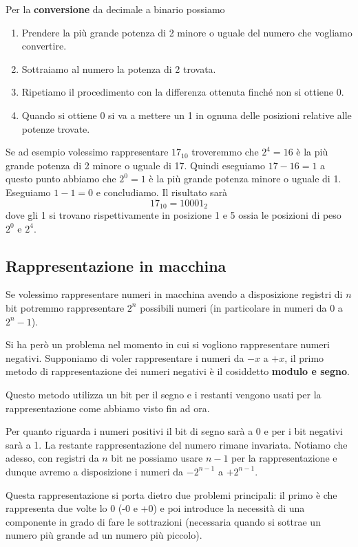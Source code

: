 Per la \textbf{conversione} da decimale a binario possiamo
\begin{enumerate}
	\item Prendere la più grande potenza di 2 minore o uguale del numero che vogliamo convertire.
	\item Sottraiamo al numero la potenza di 2 trovata.
	\item Ripetiamo il procedimento con la differenza ottenuta finché non si ottiene 0.
	\item Quando si ottiene 0 si va a mettere un 1 in ognuna delle posizioni relative alle potenze
	      trovate.
\end{enumerate}
Se ad esempio volessimo rappresentare $17_{10}$ troveremmo che $2^4 = 16$ è la più grande potenza
di 2 minore o uguale di 17. Quindi eseguiamo $17 - 16 = 1$ a questo punto abbiamo che $2^0 = 1$ è
la più grande potenza minore o uguale di 1. Eseguiamo $1-1 = 0$ e concludiamo. Il risultato sarà
\[ 17_{10} = 10001_2 \]
dove gli 1 si trovano rispettivamente in posizione 1 e 5 ossia le posizioni di peso $2^0$ e $2^4$.

\subsection{Rappresentazione in macchina}
Se volessimo rappresentare numeri in macchina avendo a disposizione registri di $n$ bit potremmo
rappresentare $2^n$ possibili numeri (in particolare in numeri da 0 a $2^n - 1$).

Si ha però un problema nel momento in cui si vogliono rappresentare numeri negativi. Supponiamo di
voler rappresentare i numeri da $-x$ a $+x$, il primo metodo di rappresentazione dei numeri
negativi è il cosiddetto \textbf{modulo e segno}.

Questo metodo utilizza un bit per il segno e i restanti vengono usati per la rappresentazione come
abbiamo visto fin ad ora.

Per quanto riguarda i numeri positivi il bit di segno sarà a 0 e per i bit negativi sarà a 1. La
restante rappresentazione del numero rimane invariata. Notiamo che adesso, con registri da $n$ bit
ne possiamo usare $n-1$ per la rappresentazione e dunque avremo a disposizione i numeri da
$-2^{n-1}$ a $+2^{n-1}$.

Questa rappresentazione si porta dietro due problemi principali: il primo è che rappresenta due
volte lo 0 (-0 e +0) e poi introduce la necessità di una componente in grado di fare le sottrazioni
(necessaria quando si sottrae un numero più grande ad un numero più piccolo).

